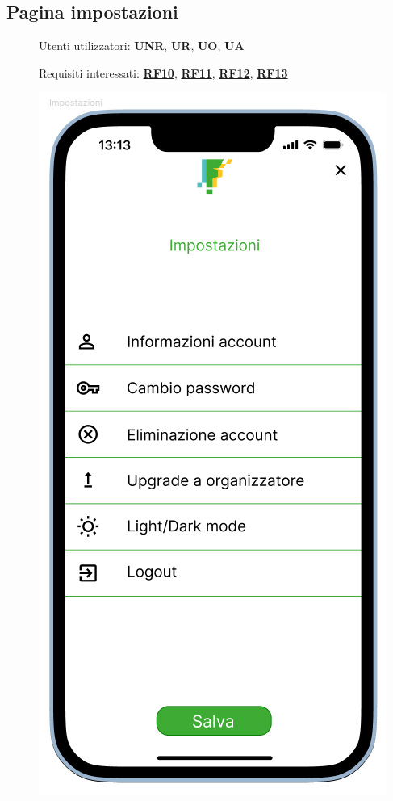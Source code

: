 \documentclass{article}
\begin{document}
\subsection{Pagina impostazioni}
\begin{description}
    \item[] Utenti utilizzatori: \textbf{UNR}, \textbf{UR}, \textbf{UO}, \textbf{UA}
    \item[] Requisiti interessati: \hyperref[rf_10]{\textbf{RF10}}, \hyperref[rf_11]{\textbf{RF11}}, \hyperref[rf_12]{\textbf{RF12}}, \hyperref[rf_13]{\textbf{RF13}}
    \item[] \begin{center}
            \includegraphics[scale=0.6]{Impostazioni.png}

\end{center}
\end{description}
\end{document}
